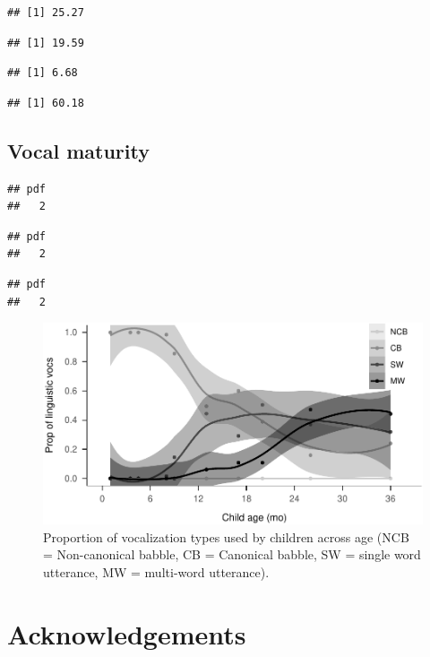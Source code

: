 \documentclass[,man,floatsintext]{apa6}
\begin{document}
\begin{verbatim}
## [1] 25.27
\end{verbatim}

\begin{verbatim}
## [1] 19.59
\end{verbatim}

\begin{verbatim}
## [1] 6.68
\end{verbatim}

\begin{verbatim}
## [1] 60.18
\end{verbatim}

\subsection{Vocal maturity}\label{vocal-maturity}

\begin{verbatim}
## pdf 
##   2
\end{verbatim}

\begin{verbatim}
## pdf 
##   2
\end{verbatim}

\begin{verbatim}
## pdf 
##   2
\end{verbatim}

\begin{figure}
\centering
\includegraphics{Yeli-CLE_files/figure-latex/fig6-1.pdf}
\caption{\label{fig:fig6}Proportion of vocalization types used by children
across age (NCB = Non-canonical babble, CB = Canonical babble, SW =
single word utterance, MW = multi-word utterance).}
\end{figure}

\section{Acknowledgements}\label{acknowledgements}
\end{document}

